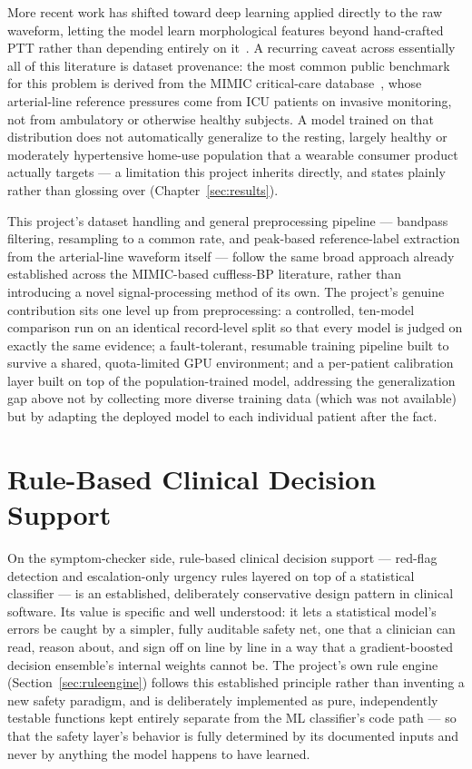 \documentclass[12pt,a4paper]{report}
\begin{document}
More recent work has shifted toward deep learning applied directly to the raw
waveform, letting the model learn morphological features beyond hand-crafted
PTT rather than depending entirely on it~\cite{ppgbp2021,ppgdl2021}. A
recurring caveat across essentially all of this literature is dataset
provenance: the most common public benchmark for this problem is derived from
the MIMIC critical-care database~\cite{mimic3}, whose arterial-line reference
pressures come from ICU patients on invasive monitoring, not from ambulatory
or otherwise healthy subjects. A model trained on that distribution does not
automatically generalize to the resting, largely healthy or moderately
hypertensive home-use population that a wearable consumer product actually
targets --- a limitation this project inherits directly, and states plainly
rather than glossing over (Chapter~\ref{sec:results}).

This project's dataset handling and general preprocessing pipeline --- bandpass
filtering, resampling to a common rate, and peak-based reference-label
extraction from the arterial-line waveform itself --- follow the same broad
approach already established across the MIMIC-based cuffless-BP literature,
rather than introducing a novel signal-processing method of its own. The
project's genuine contribution sits one level up from preprocessing: a
controlled, ten-model comparison run on an identical record-level split so
that every model is judged on exactly the same evidence; a fault-tolerant,
resumable training pipeline built to survive a shared, quota-limited GPU
environment; and a per-patient calibration layer built on top of the
population-trained model, addressing the generalization gap above not by
collecting more diverse training data (which was not available) but by
adapting the deployed model to each individual patient after the fact.

\section{Rule-Based Clinical Decision Support}

On the symptom-checker side, rule-based clinical decision support --- red-flag
detection and escalation-only urgency rules layered on top of a statistical
classifier --- is an established, deliberately conservative design pattern in
clinical software. Its value is specific and well understood: it lets a
statistical model's errors be caught by a simpler, fully auditable safety net,
one that a clinician can read, reason about, and sign off on line by line in a
way that a gradient-boosted decision ensemble's internal weights cannot be. The
project's own rule engine (Section~\ref{sec:ruleengine}) follows this
established principle rather than inventing a new safety paradigm, and is
deliberately implemented as pure, independently testable functions kept
entirely separate from the ML classifier's code path --- so that the safety
layer's behavior is fully determined by its documented inputs and never by
anything the model happens to have learned.
\end{document}
